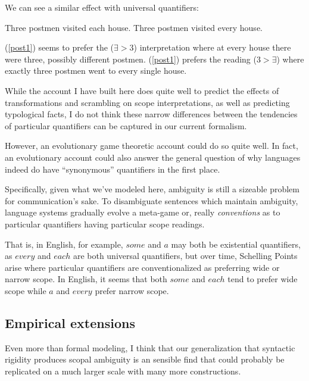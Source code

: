 \documentclass{article}
\begin{document}
We can see a similar effect with universal quantifiers:

\begin{exe}
	\ex \begin{xlist}
		\ex Three postmen visited each house.\label{post1}
		\ex Three postmen visited every house.\label{post2}
	\end{xlist}
\end{exe}

(\ref{post1}) seems to prefer the (${\exists}>3$) interpretation where at every house there were three, possibly different postmen.
(\ref{post1}) prefers the reading ($3>{\exists}$) where exactly three postmen went to every single house.

While the account I have built here does quite well to predict the effects of transformations and scrambling on scope interpretations, as well as predicting typological facts, I do not think these narrow differences between the tendencies of particular quantifiers can be captured in our current formalism.

However, an evolutionary game theoretic account \parencite{maynardsmith73} could do so quite well.
In fact, an evolutionary account could also answer the general question of why languages indeed do have ``synonymous'' quantifiers in the first place.

Specifically, given what we've modeled here, ambiguity is still a sizeable problem for communication's sake.
To disambiguate sentences which maintain ambiguity, language systems gradually evolve a meta-game or, really \emph{conventions} as to particular quantifiers having particular scope readings.

That is, in English, for example, $some$ and $a$ may both be existential quantifiers, as $every$ and $each$ are both universal quantifiers, but over time, Schelling Points arise where particular quantifiers are conventionalized as preferring wide or narrow scope.
In English, it seems that both $some$ and $each$ tend to prefer wide scope while $a$ and $every$ prefer narrow scope.

\subsection{Empirical extensions}

Even more than formal modeling, I think that our generalization that syntactic rigidity produces scopal ambiguity is an sensible find that could probably be replicated on a much larger scale with many more constructions.
\end{document}
